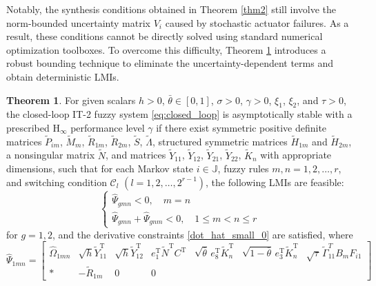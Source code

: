 \documentclass[preprint,review,fleqn,sort&compress,3p]{elsarticle}
\theoremstyle{definition} %
\theoremstyle{definition}%
\newtheorem{thm}{Theorem}[section]
\begin{document}
	Notably, the synthesis conditions obtained in Theorem \ref{thm2} still involve the norm-bounded uncertainty matrix $V_i$ caused by stochastic actuator failures. As a result, these conditions cannot be directly solved using standard numerical optimization toolboxes. To overcome this difficulty, Theorem \ref{thm3} introduces a robust bounding technique to eliminate the uncertainty-dependent terms and obtain deterministic LMIs.
	\begin{thm}\label{thm3}
		For given scalars $h>0$, $\bar{\theta}\in[0,1]$, $\sigma>0$, $\gamma>0$, $\xi_1$, $\xi_2$, and $\tau>0$, the closed-loop IT-2 fuzzy system \eqref{eq:closed_loop} is asymptotically stable with a prescribed $\mathrm{H}_\infty$ performance level $\gamma$ if there exist symmetric positive definite matrices 
		$\widetilde{P}_{im}$, 
		$\widetilde{M}_{m}$, 
		$\widetilde{R}_{1m}$, 
		$\widetilde{R}_{2m}$,
		$\widetilde{S}$,
		$\widetilde{\Lambda}$,
		structured symmetric matrices
		$\widetilde{H}_{1m}$ and
		$\widetilde{H}_{2m}$,
		a nonsingular matrix $\widetilde{N}$, 
		and matrices 
		$\widetilde{Y}_{11}$,
		$\widetilde{Y}_{12}$,
		$\widetilde{Y}_{21}$,
		$\widetilde{Y}_{22}$,
		$\widetilde{K}_n$
		with appropriate dimensions, such that for each Markov state $i\in\mathbb{J}$, fuzzy rules $m,n=1,2,\ldots,r$, and switching condition $\mathcal{C}_l$ $(l=1,2,\ldots,2^{r-1})$, the following LMIs are feasible:
		\begin{equation}\label{shucr1_hat}
			\begin{cases}
				\widehat{\Psi}_{gmn} < 0,\quad m=n \\[1ex]
				\widehat{\Psi}_{gmn} + \widehat{\Psi}_{gnm} < 0,\quad 1 \le m < n \le r
			\end{cases}
		\end{equation}
		for $g=1,2$, and the derivative constraints \eqref{dot_hat_small_0} are satisfied, where
		\begin{equation}\label{LMI1_hat}
			\widehat{\Psi}_{1mn}=
			\begin{bmatrix}
				\widehat{\Omega}_{1mn}
				&
				\sqrt{h} \widetilde Y_{11}^{\mathrm{T}}
				&
				\sqrt{h} \widetilde Y_{12}^{\mathrm{T}}
				&
				e_1^{\mathrm{T}}\widetilde N^{\mathrm{T}}C^{\mathrm{T}}
				&
				\sqrt{\bar\theta}\,e_8^{\mathrm{T}}\widetilde K_n^{\mathrm{T}}
				&
				\sqrt{1-\bar\theta}\,e_3^{\mathrm{T}}\widetilde K_n^{\mathrm{T}}
				&
				\sqrt{\tau}\,
				\widetilde{\Gamma}_{11}^{T}
				B_mF_{i1}
				\\[1.5ex]
				*
				&
				-\widetilde R_{1m}
				&
				0
				&
				0
				&

\end{bmatrix}
\end{equation}
\end{thm}
\end{document}
